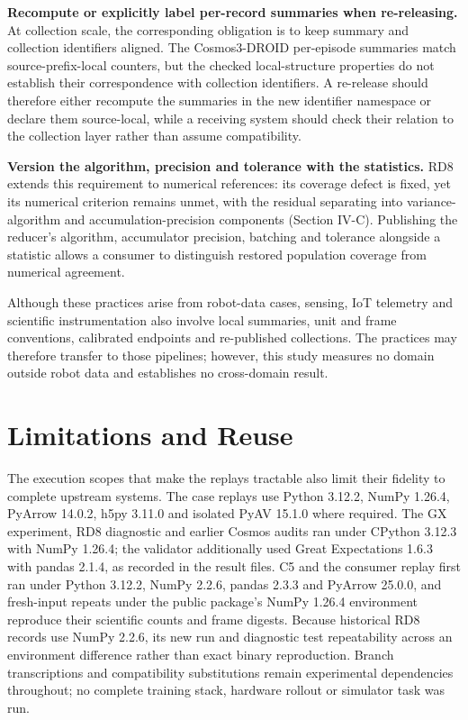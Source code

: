 \documentclass[conference]{IEEEtran}
\begin{document}
\textbf{Recompute or explicitly label per-record summaries when re-releasing.} At collection scale, the corresponding obligation is to keep summary and collection identifiers aligned. The Cosmos3-DROID per-episode summaries match source-prefix-local counters, but the checked local-structure properties do not establish their correspondence with collection identifiers. A re-release should therefore either recompute the summaries in the new identifier namespace or declare them source-local, while a receiving system should check their relation to the collection layer rather than assume compatibility.\par

\textbf{Version the algorithm, precision and tolerance with the statistics.} RD8 extends this requirement to numerical references: its coverage defect is fixed, yet its numerical criterion remains unmet, with the residual separating into variance-algorithm and accumulation-precision components (Section IV-C). Publishing the reducer's algorithm, accumulator precision, batching and tolerance alongside a statistic allows a consumer to distinguish restored population coverage from numerical agreement.\par

Although these practices arise from robot-data cases, sensing, IoT telemetry and scientific instrumentation also involve local summaries, unit and frame conventions, calibrated endpoints and re-published collections. The practices may therefore transfer to those pipelines; however, this study measures no domain outside robot data and establishes no cross-domain result.\par

\section{Limitations and Reuse}

The execution scopes that make the replays tractable also limit their fidelity to complete upstream systems. The case replays use Python 3.12.2, NumPy 1.26.4, PyArrow 14.0.2, h5py 3.11.0 and isolated PyAV 15.1.0 where required. The GX experiment, RD8 diagnostic and earlier Cosmos audits ran under CPython 3.12.3 with NumPy 1.26.4; the validator additionally used Great Expectations 1.6.3 with pandas 2.1.4, as recorded in the result files. C5 and the consumer replay first ran under Python 3.12.2, NumPy 2.2.6, pandas 2.3.3 and PyArrow 25.0.0, and fresh-input repeats under the public package's NumPy 1.26.4 environment reproduce their scientific counts and frame digests. Because historical RD8 records use NumPy 2.2.6, its new run and diagnostic test repeatability across an environment difference rather than exact binary reproduction. Branch transcriptions and compatibility substitutions remain experimental dependencies throughout; no complete training stack, hardware rollout or simulator task was run.\par
\end{document}
